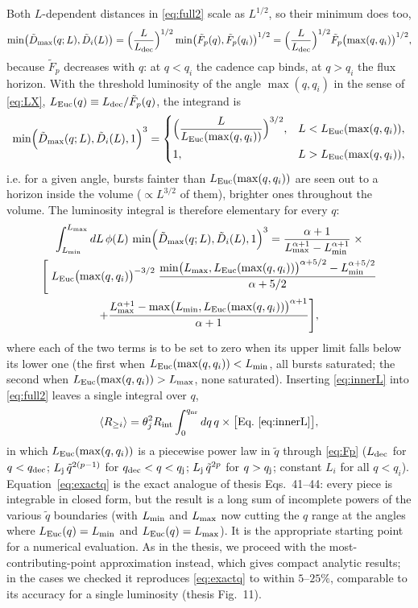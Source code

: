 \documentclass[11pt,a4paper]{article}
\newcommand{\tq}{\tilde{q}}
\newcommand{\tD}{\tilde{D}}
\newcommand{\tF}{\tilde{F}}
\newcommand{\Euc}{{\rm Euc}}
\newcommand{\dec}{{\rm dec}}
\newcommand{\nr}{{\rm nr}}
\newcommand{\Rint}{R_{\rm int}}
\newcommand{\Ravg}{\langle R_{\geq i}\rangle}
\newcommand{\Lmin}{L_{\rm min}}
\newcommand{\Lmax}{L_{\rm max}}
\newcommand{\Ldec}{L_{\rm dec}}
\newcommand{\Lj}{L_{\rm j}}
\begin{document}
Both $L$-dependent distances in \eqref{eq:full2} scale as $L^{1/2}$, so their minimum does too,
\begin{equation}
\min\bigl(\tD_{\max}(q;L),\tD_i(L)\bigr)=\Bigl(\frac{L}{\Ldec}\Bigr)^{1/2}\min\bigl(\tF_p(q),\tF_p(q_i)\bigr)^{1/2}=\Bigl(\frac{L}{\Ldec}\Bigr)^{1/2}\tF_p\bigl(\max(q,q_i)\bigr)^{1/2},
\end{equation}
because $\tF_p$ decreases with $q$: at $q<q_i$ the cadence cap binds, at $q>q_i$ the flux horizon. With the threshold luminosity of the angle $\max(q,q_i)$ in the sense of \eqref{eq:LX}, $L_\Euc(q)\equiv\Ldec/\tF_p(q)$, the integrand is
\begin{equation}
\min\Bigl(\tD_{\max}(q;L),\tD_i(L),1\Bigr)^3=\begin{cases}\Bigl(\dfrac{L}{L_\Euc(\max(q,q_i))}\Bigr)^{3/2}, & L<L_\Euc(\max(q,q_i)),\\[8pt] 1, & L>L_\Euc(\max(q,q_i)),\end{cases}
\end{equation}
i.e. for a given angle, bursts fainter than $L_\Euc(\max(q,q_i))$ are seen out to a horizon inside the volume ($\propto L^{3/2}$ of them), brighter ones throughout the volume. The luminosity integral is therefore elementary for every $q$:
\begin{multline}
\label{eq:innerL}
\int_{\Lmin}^{\Lmax}dL\,\phi(L)\,\min\Bigl(\tD_{\max}(q;L),\tD_i(L),1\Bigr)^3
=\frac{\alpha+1}{\Lmax^{\alpha+1}-\Lmin^{\alpha+1}}\;\times\\
\Biggl[\;L_\Euc\bigl(\max(q,q_i)\bigr)^{-3/2}\;\frac{\min\bigl(\Lmax,L_\Euc(\max(q,q_i))\bigr)^{\alpha+5/2}-\Lmin^{\alpha+5/2}}{\alpha+5/2}\\
+\frac{\Lmax^{\alpha+1}-\max\bigl(\Lmin,L_\Euc(\max(q,q_i))\bigr)^{\alpha+1}}{\alpha+1}\Biggr],
\end{multline}
where each of the two terms is to be set to zero when its upper limit falls below its lower one (the first when $L_\Euc(\max(q,q_i))<\Lmin$, all bursts saturated; the second when $L_\Euc(\max(q,q_i))>\Lmax$, none saturated). Inserting \eqref{eq:innerL} into \eqref{eq:full2} leaves a single integral over $q$,
\begin{equation}
\label{eq:exactq}
\Ravg=\theta_j^2\Rint\int_0^{q_\nr}dq\,q\times\bigl[\text{Eq.~\eqref{eq:innerL}}\bigr],
\end{equation}
in which $L_\Euc(\max(q,q_i))$ is a piecewise power law in $\tq$ through \eqref{eq:Fp} ($\Ldec$ for $q<q_\dec$; $\Lj\,\tq^{2(p-1)}$ for $q_\dec<q<q_{\rm j}$; $\Lj\,\tq^{2p}$ for $q>q_{\rm j}$; constant $L_i$ for all $q<q_i$). Equation~\eqref{eq:exactq} is the exact analogue of thesis Eqs.~41--44: every piece is integrable in closed form, but the result is a long sum of incomplete powers of the various $\tq$ boundaries (with $\Lmin$ and $\Lmax$ now cutting the $q$ range at the angles where $L_\Euc(q)=\Lmin$ and $L_\Euc(q)=\Lmax$). It is the appropriate starting point for a numerical evaluation. As in the thesis, we proceed with the most-contributing-point approximation instead, which gives compact analytic results; in the cases we checked it reproduces \eqref{eq:exactq} to within $5$--$25\%$, comparable to its accuracy for a single luminosity (thesis Fig.~11).
\end{document}
